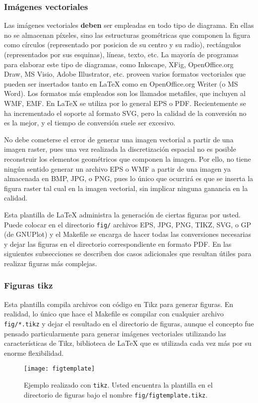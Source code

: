 \subsubsection{Imágenes vectoriales}

 Las imágenes vectoriales \textbf{deben} ser
empleadas en todo tipo de diagrama. En ellas no se almacenan píxeles,
sino las estructuras geométricas que componen la figura como círculos
(representado por posicion de su centro y su radio), rectángulos
(representados por sus esquinas), líneas, texto, etc. La mayoría de
programas para elaborar este tipo de diagramas, como Inkscape, XFig,
OpenOffice.org Draw, MS Visio, Adobe Illustrator, etc. proveen varios
formatos vectoriales que pueden ser insertados tanto en LaTeX como en
OpenOffice.org Writer (o MS Word). Los formatos más empleados son los
llamados metafiles, que incluyen al WMF, EMF. En LaTeX se utiliza por
lo general EPS o PDF. Recientemente se ha incrementado el soporte al
formato SVG, pero la calidad de la conversión no es la mejor, y el
tiempo de conversión suele ser excesivo.  

No debe cometerse el error de generar una imagen vectorial a partir de una
imagen raster, pues una vez realizada la discretización espacial no es posible
reconstruir los elementos geométricos que componen la imagen. Por ello, no
tiene ningún sentido generar un archivo EPS o WMF a partir de una imagen ya
almacenada en BMP, JPG, o PNG, pues lo único que ocurrirá es que se inserta la
figura raster tal cual en la imagen vectorial, sin implicar ninguna ganancia en
la calidad.

Esta plantilla de LaTeX administra la generación de ciertas figuras
por usted.  Puede colocar en el directorio \texttt{fig/} archivos EPS,
JPG, PNG, TIKZ, SVG, o GP (de GNUPlot) y el Makefile se encarga de
hacer todas las conversiones necesarias y dejar las figuras en el
directorio correspondiente en formato PDF.  En las siguientes
subsecciones se describen dos casos adicionales que resultan útiles
para realizar figuras más complejas.

\subsubsection{Figuras tikz}

Esta plantilla compila archivos con código en Tikz para generar
figuras.
%
En realidad, lo único que hace el Makefile es compilar con
 cualquier archivo \texttt{fig/*.tikz} y dejar el
resultado en el directorio de figuras, aunque el concepto fue pensado
particularmente para generar imágenes vectoriales utilizando las
características de Tikz, biblioteca de LaTeX que es utilizada cada vez
más por su enorme flexibilidad.
%
\begin{figure}[htb]
  \centering
  \texttt{[image: figtemplate]}
  \caption[Ejemplo de figura con tikz]{Ejemplo realizado con
    \texttt{tikz}.  Usted encuentra la plantilla en el directorio de
    figuras bajo el nombre \texttt{fig/figtemplate.tikz}.}
  \label{fig:figtemplate}
\end{figure}

